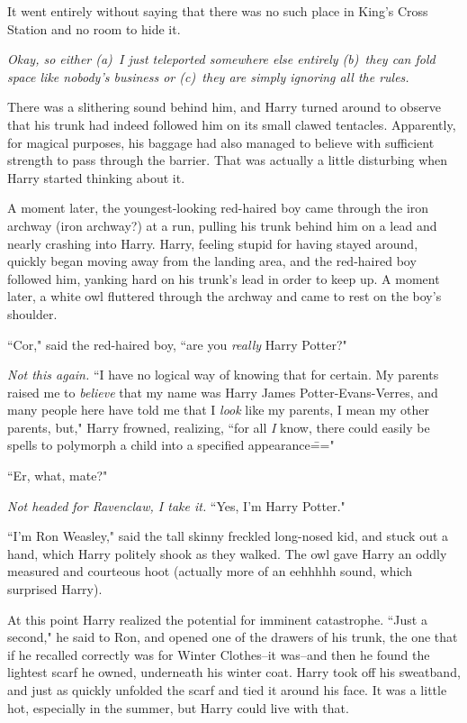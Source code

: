 It went entirely without saying that there was no such place in King's Cross Station and no room to hide it.

\emph{Okay, so either (a)~I just teleported somewhere else entirely (b)~they can fold space like nobody's business or (c)~they are simply ignoring all the rules.}

There was a slithering sound behind him, and Harry turned around to observe that his trunk had indeed followed him on its small clawed tentacles. Apparently, for magical purposes, his baggage had also managed to believe with sufficient strength to pass through the barrier. That was actually a little disturbing when Harry started thinking about it.

A moment later, the youngest-looking red-haired boy came through the iron archway (iron archway?) at a run, pulling his trunk behind him on a lead and nearly crashing into Harry. Harry, feeling stupid for having stayed around, quickly began moving away from the landing area, and the red-haired boy followed him, yanking hard on his trunk's lead in order to keep up. A moment later, a white owl fluttered through the archway and came to rest on the boy's shoulder.

``Cor," said the red-haired boy, ``are you \emph{really} Harry Potter?"

\emph{Not this again.} ``I have no logical way of knowing that for certain. My parents raised me to \emph{believe} that my name was Harry James Potter-Evans-Verres, and many people here have told me that I \emph{look} like my parents, I mean my other parents, but," Harry frowned, realizing, ``for all \emph{I} know, there could easily be spells to polymorph a child into a specified appearance\==="

``Er, what, mate?"

\emph{Not headed for Ravenclaw, I take it.} ``Yes, I'm Harry Potter."

``I'm Ron Weasley," said the tall skinny freckled long-nosed kid, and stuck out a hand, which Harry politely shook as they walked. The owl gave Harry an oddly measured and courteous hoot (actually more of an eehhhhh sound, which surprised Harry).

At this point Harry realized the potential for imminent catastrophe. ``Just a second," he said to Ron, and opened one of the drawers of his trunk, the one that if he recalled correctly was for Winter Clothes\---it was\---and then he found the lightest scarf he owned, underneath his winter coat. Harry took off his sweatband, and just as quickly unfolded the scarf and tied it around his face. It was a little hot, especially in the summer, but Harry could live with that.

